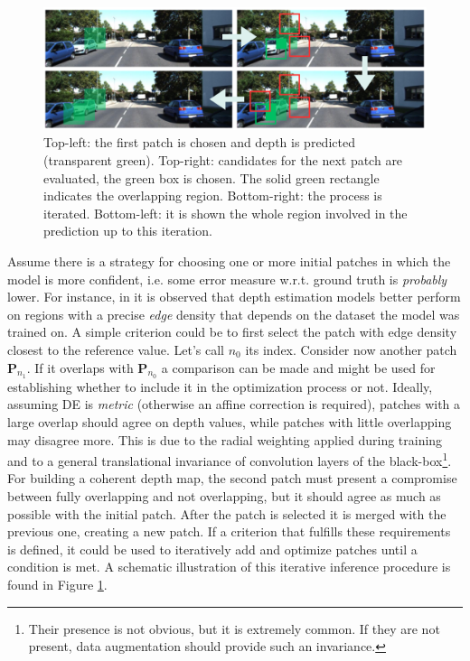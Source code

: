 \begin{figure}
    \centering
    \includegraphics[scale=0.3]{figs/fusion_boxes}
    \caption{
        Top-left: the first patch is chosen and depth is predicted (transparent green).
        Top-right: candidates for the next patch are evaluated, the green box is chosen.
        The solid green rectangle indicates the overlapping region.
        Bottom-right: the process is iterated.
        Bottom-left: it is shown the whole region involved in the prediction up to this iteration.
        \label{fig:fusion_boxes}
    }
\end{figure}


Assume there is a strategy for choosing one or more initial patches in which the model is more confident, i.e. some error measure w.r.t. ground truth is \textit{probably} lower.
For instance, in \cite{BoostingDepth} it is observed that depth estimation models better perform on regions with a precise \textit{edge} density that depends on the dataset the model was trained on.
A simple criterion could be to first select the patch with edge density closest to the reference value.
Let's call $n_{0}$ its index.
Consider now another patch $\mathbf{P}_{n_{1}}$.
If it overlaps with $\mathbf{P}_{n_{0}}$ a comparison can be made and might be used for establishing whether to include it in the optimization process or not.
Ideally, assuming DE is \textit{metric} (otherwise an affine correction is required), patches with a large overlap should agree on depth values, while patches with little overlapping may disagree more.
This is due to the radial weighting applied during training and to a general translational invariance of convolution layers of the black-box\footnote{Their presence is not obvious, but it is extremely common. If they are not present, data augmentation should provide such an invariance.}.
For building a coherent depth map, the second patch must present a compromise between fully overlapping and not overlapping, but it should agree as much as possible with the initial patch.
After the patch is selected it is merged with the previous one, creating a new patch.
If a criterion that fulfills these requirements is defined, it could be used to iteratively add and optimize patches until a condition is met.
A schematic illustration of this iterative inference procedure is found in Figure \ref{fig:fusion_boxes}.

